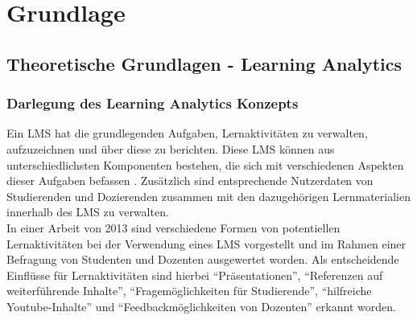\chapter{Grundlage} %

\section{Theoretische Grundlagen - Learning Analytics}

\subsection{Darlegung des Learning Analytics Konzepts}

Ein \ac{LMS} hat die grundlegenden Aufgaben, Lernaktivitäten zu verwalten, aufzuzeichnen und über diese zu berichten. Diese \ac{LMS} können aus unterschiedlichsten Komponenten bestehen, die sich mit verschiedenen Aspekten dieser Aufgaben befassen \autocite[S.1]{learningManagementSystemsFieldGuide}. Zusätzlich sind entsprechende Nutzerdaten von Studierenden und Dozierenden zusammen mit den dazugehörigen Lernmaterialien innerhalb des \ac{LMS} zu verwalten. \autocite{learningManagementSystemDefinition}\\
In einer Arbeit von 2013 \autocite[S.253]{SCHOONENBOOM2014247} sind verschiedene Formen von potentiellen Lernaktivitäten bei der Verwendung eines \ac{LMS} vorgestellt und im Rahmen einer Befragung von Studenten und Dozenten ausgewertet worden. Als entscheidende Einflüsse für Lernaktivitäten sind hierbei \enquote{Präsentationen}, \enquote{Referenzen auf weiterführende Inhalte}, \enquote{Fragemöglichkeiten für Studierende}, \enquote{hilfreiche Youtube-Inhalte} und \enquote{Feedbackmöglichkeiten von Dozenten} erkannt worden.

